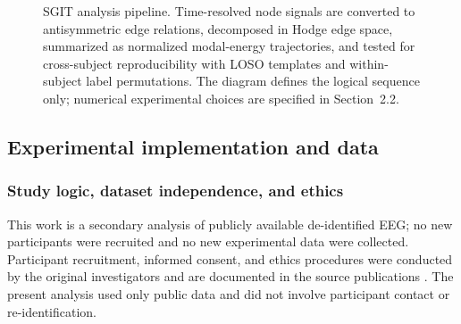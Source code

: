 \documentclass[12pt]{article}
\begin{document}
\begin{figure}[t]
\centering
{}
\caption{SGIT analysis pipeline. Time-resolved node signals are converted to antisymmetric edge relations, decomposed in Hodge edge space, summarized as normalized modal-energy trajectories, and tested for cross-subject reproducibility with LOSO templates and within-subject label permutations. The diagram defines the logical sequence only; numerical experimental choices are specified in Section~2.2.}
\label{fig:pipeline}
\end{figure}

\subsection{Experimental implementation and data}
\subsubsection{Study logic, dataset independence, and ethics}
This work is a secondary analysis of publicly available de-identified EEG; no new participants were recruited and no new experimental data were collected. Participant recruitment, informed consent, and ethics procedures were conducted by the original investigators and are documented in the source publications \citep{EklundWiens2018,Wiens2026}. The present analysis used only public data and did not involve participant contact or re-identification.
\end{document}
